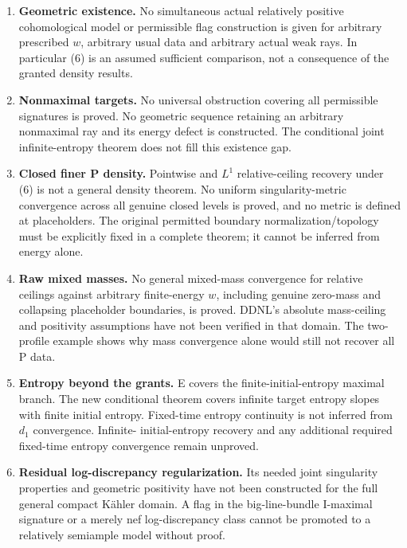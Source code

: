 \documentclass[
  11pt,
]{article}
\providecommand{\tightlist}{%
  \setlength{\itemsep}{0pt}\setlength{\parskip}{0pt}}
\begin{document}
\begin{enumerate}
\def\labelenumi{\arabic{enumi}.}
\tightlist
\item
  \textbf{Geometric existence.} No simultaneous actual relatively
  positive cohomological model or permissible flag construction is given
  for arbitrary prescribed \(w\), arbitrary usual data and arbitrary
  actual weak rays. In particular (6) is an assumed sufficient
  comparison, not a consequence of the granted density results.
\item
  \textbf{Nonmaximal targets.} No universal obstruction covering all
  permissible signatures is proved. No geometric sequence retaining an
  arbitrary nonmaximal ray and its energy defect is constructed. The
  conditional joint infinite-entropy theorem does not fill this
  existence gap.
\item
  \textbf{Closed finer P density.} Pointwise and \(L^1\)
  relative-ceiling recovery under (6) is not a general density theorem.
  No uniform singularity-metric convergence across all genuine closed
  levels is proved, and no metric is defined at placeholders. The
  original permitted boundary normalization/topology must be explicitly
  fixed in a complete theorem; it cannot be inferred from energy alone.
\item
  \textbf{Raw mixed masses.} No general mixed-mass convergence for
  relative ceilings against arbitrary finite-energy \(w\), including
  genuine zero-mass and collapsing placeholder boundaries, is proved.
  DDNL's absolute mass-ceiling and positivity assumptions have not been
  verified in that domain. The two-profile example shows why mass
  convergence alone would still not recover all P data.
\item
  \textbf{Entropy beyond the grants.} E covers the
  finite-initial-entropy maximal branch. The new conditional theorem
  covers infinite target entropy slopes with finite initial entropy.
  Fixed-time entropy continuity is not inferred from \(d_1\)
  convergence. Infinite- initial-entropy recovery and any additional
  required fixed-time entropy convergence remain unproved.
\item
  \textbf{Residual log-discrepancy regularization.} Its needed joint
  singularity properties and geometric positivity have not been
  constructed for the full general compact Kähler domain. A flag in the
  big-line-bundle I-maximal signature or a merely nef log-discrepancy
  class cannot be promoted to a relatively semiample model without
  proof.
\end{enumerate}
\end{document}
